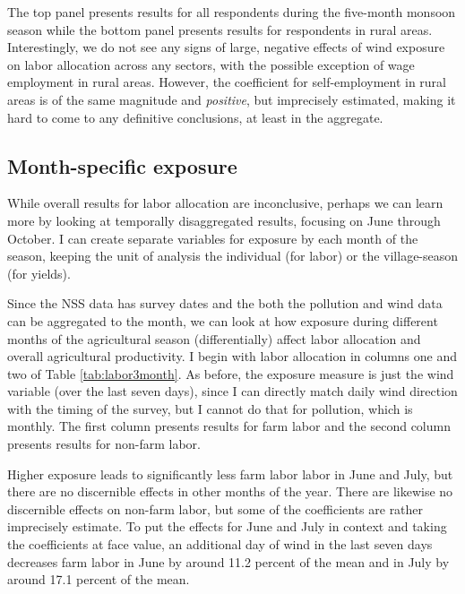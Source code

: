\documentclass[
]{article}
\begin{document}
The top panel presents results for all respondents during the five-month monsoon season while the bottom panel presents results for respondents in rural areas. Interestingly, we do not see any signs of large, negative effects of wind exposure on labor allocation across any sectors, with the possible exception of wage employment in rural areas. However, the coefficient for self-employment in rural areas is of the same magnitude and \emph{positive}, but imprecisely estimated, making it hard to come to any definitive conclusions, at least in the aggregate.

\hypertarget{month-specific-exposure}{%
\subsection{Month-specific exposure}\label{month-specific-exposure}}

While overall results for labor allocation are inconclusive, perhaps we can learn more by looking at temporally disaggregated results, focusing on June through October. I can create separate variables for exposure by each month of the season, keeping the unit of analysis the individual (for labor) or the village-season (for yields).

Since the NSS data has survey dates and the both the pollution and wind data can be aggregated to the month, we can look at how exposure during different months of the agricultural season (differentially) affect labor allocation and overall agricultural productivity. I begin with labor allocation in columns one and two of Table \ref{tab:labor3month}. As before, the exposure measure is just the wind variable (over the last seven days), since I can directly match daily wind direction with the timing of the survey, but I cannot do that for pollution, which is monthly. The first column presents results for farm labor and the second column presents results for non-farm labor.

Higher exposure leads to significantly less farm labor labor in June and July, but there are no discernible effects in other months of the year. There are likewise no discernible effects on non-farm labor, but some of the coefficients are rather imprecisely estimate. To put the effects for June and July in context and taking the coefficients at face value, an additional day of wind in the last seven days decreases farm labor in June by around 11.2 percent of the mean and in July by around 17.1 percent of the mean.
\end{document}
